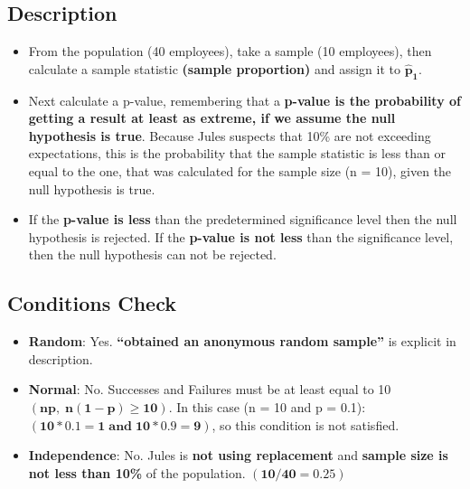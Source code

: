 \documentclass[12pt]{article}
\begin{document}
\subsection*{Description}
\begin{itemize}
  \item From the population (40 employees), take a sample (10 employees), then calculate a sample statistic \textbf{(sample proportion)} and assign it to $\bm{\hat{p}_{1}}$.
  \item Next calculate a p-value, remembering that a \textbf{p-value is the probability of getting a result at least as extreme, if we assume the null hypothesis is true}. Because Jules suspects that 10\% are not exceeding expectations, this is the probability that the sample statistic is less than or equal to the one, that was calculated for the sample size (n = 10), given the null hypothesis is true.
  \item If the \textbf{p-value is less} than the predetermined significance level then the null hypothesis is rejected. If the \textbf{p-value is not less} than the significance level, then the null hypothesis can not be rejected.
\end{itemize}
\subsection*{Conditions Check}
\begin{itemize}
  \item \textbf{Random}: Yes. \textbf{``obtained an anonymous random sample''} is explicit in description.
  \item \textbf{Normal}: No. Successes and Failures must be at least equal to 10 $\bm{(np, \; n(1-p) \ge 10)}$. In this case (n = 10 and p = 0.1): $\bm{(10*0.1=1 \;and\; 10*0.9=9)}$, so this condition is not satisfied.
  \item \textbf{Independence}: No. Jules is \textbf{not using replacement} and \textbf{sample size is not less than 10\%} of the population. $\bm{(10/40=0.25)}$
\end{itemize}
\end{document}

